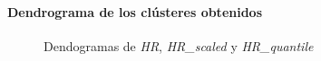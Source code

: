 \paragraph{Dendrograma de los clústeres obtenidos}

\begin{figure}[H]
    \centering
    
    \caption{Dendogramas de \textit{HR}, \textit{HR\_scaled} y \textit{HR\_quantile}}
    \label{fig:raw_data_den_fc}
\end{figure}


